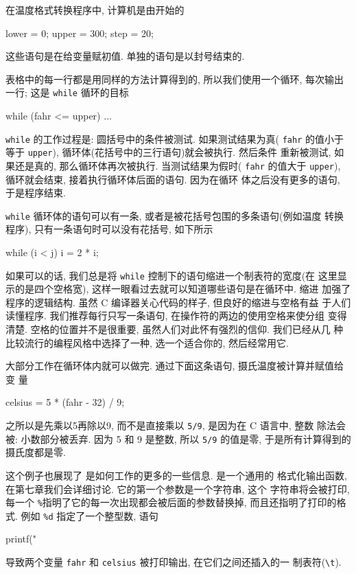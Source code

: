 在温度格式转换程序中, 计算机是由开始的
\begin{myverbatim}
    lower   = 0;
    upper   = 300;
    step    = 20;
\end{myverbatim}
这些语句是在给变量赋初值. 单独的语句是以封号结束的.

表格中的每一行都是用同样的方法计算得到的, 所以我们使用一个循环, 每次输出
一行; 这是 \verb"while" 循环的目标
\begin{myverbatim}
    while (fahr <= upper) {
        ...
    }
\end{myverbatim}
\verb"while" 的工作过程是: 圆括号中的条件被测试. 如果测试结果为真( \verb"fahr"
的值小于等于 \verb"upper"), 循环体(花括号中的三行语句)就会被执行. 然后条件
重新被测试, 如果还是真的, 那么循环体再次被执行. 当测试结果为假时( \verb"fahr"
的值大于 \verb"upper"), 循环就会结束, 接着执行循环体后面的语句. 因为在循环
体之后没有更多的语句, 于是程序结束.

\verb"while" 循环体的语句可以有一条, 或者是被花括号包围的多条语句(例如温度
转换程序), 只有一条语句时可以没有花括号, 如下所示
\begin{myverbatim}
    while (i < j)
        i = 2 * i;
\end{myverbatim}
如果可以的话, 我们总是将 \verb"while" 控制下的语句缩进一个制表符的宽度(在
这里显示的是四个空格宽), 这样一眼看过去就可以知道哪些语句是在循环中. 缩进
加强了程序的逻辑结构. 虽然 C 编译器关心代码的样子, 但良好的缩进与空格有益
于人们读懂程序. 我们推荐每行只写一条语句, 在操作符的两边的使用空格来使分组
变得清楚. 空格的位置并不是很重要, 虽然人们对此怀有强烈的信仰. 我们已经从几
种比较流行的编程风格中选择了一种, 选一个适合你的, 然后经常用它.

大部分工作在循环体内就可以做完. 通过下面这条语句, 摄氏温度被计算并赋值给变
量
\begin{myverbatim}
    celsius = 5 * (fahr - 32) / 9;
\end{myverbatim}
之所以是先乘以5再除以9, 而不是直接乘以 \verb"5/9", 是因为在 C 语言中, 整数
除法会被: 小数部分被丢弃. 因为 5 和 9 是整数, 所以 \verb"5/9"
的值是零, 于是所有计算得到的摄氏度都是零.

这个例子也展现了 \printf 是如何工作的更多的一些信息. \printf 是一个通用的
格式化输出函数, 在第七章我们会详细讨论. 它的第一个参数是一个字符串, 这个 
字符串将会被打印, 每一个 \verb"%"指明了它的每一次出现都会被后面的参数替换掉,
而且还指明了打印的格式. 例如 \verb"%d" 指定了一个整型数, 语句
\begin{myverbatim}
    printf("%
\end{myverbatim}
导致两个变量 \verb"fahr" 和 \verb"celsius" 被打印输出, 在它们之间还插入的一
制表符(\verb"\t").


